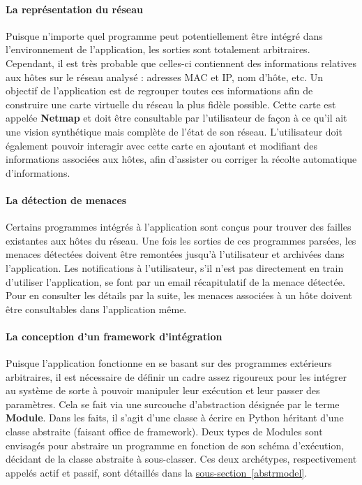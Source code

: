\documentclass[]{article}
\newcommand{\wordlink}[2]{\hyperref[#1]{#2~\ref{#1}}}
\begin{document}
\paragraph{La représentation du réseau}

Puisque n'importe quel programme peut potentiellement être intégré dans l'environnement de l'application, les sorties sont totalement arbitraires. Cependant, il est très probable que celles-ci contiennent des informations relatives aux hôtes sur le réseau analysé : adresses MAC et IP, nom d'hôte, etc. Un objectif de l'application est de regrouper toutes ces informations afin de construire une carte virtuelle du réseau la plus fidèle possible. Cette carte est appelée \textbf{Netmap} et doit être consultable par l'utilisateur de façon à ce qu'il ait une vision synthétique mais complète de l'état de son réseau. L'utilisateur doit également pouvoir interagir avec cette carte en ajoutant et modifiant des informations associées aux hôtes, afin d'assister ou corriger la récolte automatique d'informations.

\paragraph{La détection de menaces}

Certains programmes intégrés à l'application sont conçus pour trouver des failles existantes aux hôtes du réseau. Une fois les sorties de ces programmes parsées, les menaces détectées doivent être remontées jusqu'à l'utilisateur et archivées dans l'application. Les notifications à l'utilisateur, s'il n'est pas directement en train d'utiliser l'application, se font par un email récapitulatif de la menace détectée. Pour en consulter les détails par la suite, les menaces associées à un hôte doivent être consultables dans l'application même.

\paragraph{La conception d'un framework d'intégration}

Puisque l'application fonctionne en se basant sur des programmes extérieurs arbitraires, il est nécessaire de définir un cadre assez rigoureux pour les intégrer au système de sorte à pouvoir manipuler leur exécution et leur passer des paramètres. Cela se fait via une surcouche d'abstraction désignée par le terme \textbf{Module}. Dans les faits, il s'agit d'une classe à écrire en Python héritant d'une classe abstraite (faisant office de framework). Deux types de Modules sont envisagés pour abstraire un programme en fonction de son schéma d'exécution, décidant de la classe abstraite à sous-classer. Ces deux archétypes, respectivement appelés actif et passif, sont détaillés dans la \wordlink{abstrmodel}{sous-section}.
\end{document}

